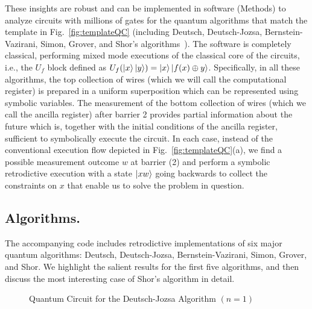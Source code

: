 \documentclass{article}
\begin{document}
\begin{refsection}
These insights are robust and can be implemented in software (Methods)
to analyze circuits with millions of gates for the quantum algorithms
that match the template in Fig.~\ref{fig:templateQC} (including
Deutsch, Deutsch-Jozsa, Bernstein-Vazirani, Simon, Grover, and Shor's
algorithms~\cite{doi:10.1137/S0097539796300921,deutsch,deutschJozsa,365701,doi:10.1137/S0097539795293172,nielsen_chuang_2010,10.1145/237814.237866}). The
software is completely classical, performing mixed mode executions of
the classical core of the circuits, i.e., the $U_f$ block defined as
$U_f(\ket{x}\ket{y}) = \ket{x}\ket{f(x) \oplus y}$. Specifically, in
all these algorithms, the top collection of wires (which we will call
the computational register) is prepared in a uniform superposition
which can be represented using symbolic variables. The measurement of
the bottom collection of wires (which we call the ancilla register)
after barrier 2 provides partial information about the future which
is, together with the initial conditions of the ancilla register,
sufficient to symbolically execute the circuit. In each case, instead
of the conventional execution flow depicted in
Fig.~\ref{fig:templateQC}(a), we find a possible measurement outcome
$w$ at barrier (2) and perform a symbolic retrodictive execution with
a state $\ket{xw}$ going backwards to collect the constraints on $x$
that enable us to solve the problem in question.

\subsection*{Algorithms.} 

The accompanying code includes retrodictive implementations of six
major quantum algorithms: Deutsch, Deutsch-Jozsa, Bernstein-Vazirani,
Simon, Grover, and Shor. We highlight the salient results for the
first five algorithms, and then discuss the most interesting case of
Shor's algorithm in detail.

\begin{wrapfigure}{r}{6cm}
  \centering
{}
\caption{\label{fig:deutsch}Quantum Circuit for the Deutsch-Jozsa
  Algorithm $(n=1)$}
\end{wrapfigure}

\end{refsection}
\end{document}

